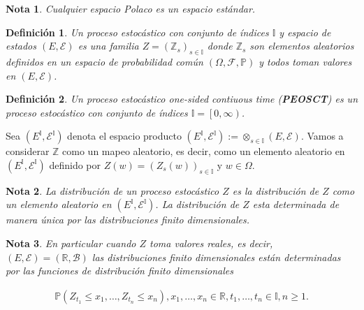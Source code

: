 \documentclass{article}
\newtheorem{Def}{Definición}[section]
\newtheorem{Note}{Nota}[section]
\newcommand{\prob}{\mathbb{P}}
\numberwithin{equation}{section}
\begin{document}
\begin{Note}
Cualquier espacio Polaco es un espacio est\'andar.
\end{Note}


\begin{Def}
Un proceso estoc\'astico con conjunto de \'indices $\mathbb{I}$ y espacio de estados $\left(E,\mathcal{E}\right)$ es una familia $Z=\left(\mathbb{Z}_{s}\right)_{s\in\mathbb{I}}$ donde $\mathbb{Z}_{s}$ son elementos aleatorios definidos en un espacio de probabilidad com\'un $\left(\Omega,\mathcal{F},\prob\right)$ y todos toman valores en $\left(E,\mathcal{E}\right)$.
\end{Def}

\begin{Def}
Un proceso estoc\'astico \textit{one-sided contiuous time} (\textbf{PEOSCT}) es un proceso estoc\'astico con conjunto de \'indices $\mathbb{I}=\left[0,\infty\right)$.
\end{Def}


Sea $\left(E^{\mathbb{I}},\mathcal{E}^{\mathbb{I}}\right)$ denota el espacio producto $\left(E^{\mathbb{I}},\mathcal{E}^{\mathbb{I}}\right):=\otimes_{s\in\mathbb{I}}\left(E,\mathcal{E}\right)$. Vamos a considerar $\mathbb{Z}$ como un mapeo aleatorio, es decir, como un elemento aleatorio en $\left(E^{\mathbb{I}},\mathcal{E}^{\mathbb{I}}\right)$ definido por $Z\left(w\right)=\left(Z_{s}\left(w\right)\right)_{s\in\mathbb{I}}$ y $w\in\Omega$.

\begin{Note}
La distribuci\'on de un proceso estoc\'astico $Z$ es la distribuci\'on de $Z$ como un elemento aleatorio en $\left(E^{\mathbb{I}},\mathcal{E}^{\mathbb{I}}\right)$. La distribuci\'on de $Z$ esta determinada de manera \'unica por las distribuciones finito dimensionales.
\end{Note}

\begin{Note}
En particular cuando $Z$ toma valores reales, es decir, $\left(E,\mathcal{E}\right)=\left(\mathbb{R},\mathcal{B}\right)$ las distribuciones finito dimensionales est\'an determinadas por las funciones de distribuci\'on finito dimensionales

\begin{eqnarray}
\prob\left(Z_{t_{1}}\leq x_{1},\ldots,Z_{t_{n}}\leq x_{n}\right),x_{1},\ldots,x_{n}\in\mathbb{R},t_{1},\ldots,t_{n}\in\mathbb{I},n\geq1.
\end{eqnarray}
\end{Note}
\end{document}
